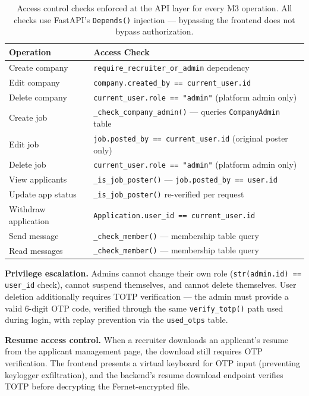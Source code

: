 \begin{table}[H]
\centering
\small
\begin{tabular}{p{4.5cm} p{8.5cm}}
    \toprule
    \textbf{Operation} & \textbf{Access Check} \\
    \midrule
    Create company & \texttt{require\_recruiter\_or\_admin} dependency \\
    Edit company & \texttt{company.created\_by == current\_user.id} \\
    Delete company & \texttt{current\_user.role == "admin"} (platform admin only) \\
    Create job & \texttt{\_check\_company\_admin()} — queries \texttt{CompanyAdmin} table \\
    Edit job & \texttt{job.posted\_by == current\_user.id} (original poster only) \\
    Delete job & \texttt{current\_user.role == "admin"} (platform admin only) \\
    View applicants & \texttt{\_is\_job\_poster()} — \texttt{job.posted\_by == user.id} \\
    Update app status & \texttt{\_is\_job\_poster()} re-verified per request \\
    Withdraw application & \texttt{Application.user\_id == current\_user.id} \\
    Send message & \texttt{\_check\_member()} — membership table query \\
    Read messages & \texttt{\_check\_member()} — membership table query \\
    \bottomrule
\end{tabular}
\caption{Access control checks enforced at the API layer for every M3 operation. All checks use FastAPI's \texttt{Depends()} injection — bypassing the frontend does not bypass authorization.}
\end{table}

\textbf{Privilege escalation.} Admins cannot change their own role (\texttt{str(admin.id) == user\_id} check), cannot suspend themselves, and cannot delete themselves. User deletion additionally requires TOTP verification — the admin must provide a valid 6-digit OTP code, verified through the same \texttt{verify\_totp()} path used during login, with replay prevention via the \texttt{used\_otps} table.

\textbf{Resume access control.} When a recruiter downloads an applicant's resume from the applicant management page, the download still requires OTP verification. The frontend presents a virtual keyboard for OTP input (preventing keylogger exfiltration), and the backend's resume download endpoint verifies TOTP before decrypting the Fernet-encrypted file.

